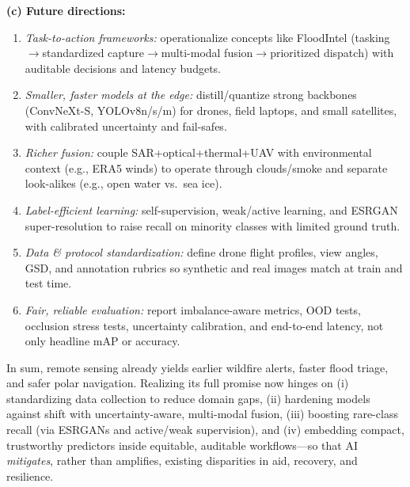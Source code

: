\documentclass[conference,a4paper]{IEEEtran}
\begin{document}
\noindent\hspace*{1em}\textbf{(c) Future directions:}
\begin{enumerate}
  \item \textit{Task-to-action frameworks:} operationalize concepts like FloodIntel (tasking$\rightarrow$standardized capture$\rightarrow$multi-modal fusion$\rightarrow$prioritized dispatch) with auditable decisions and latency budgets.
  \item \textit{Smaller, faster models at the edge:} distill/quantize strong backbones (ConvNeXt-S, YOLOv8n/s/m) for drones, field laptops, and small satellites, with calibrated uncertainty and fail-safes.
  \item \textit{Richer fusion:} couple SAR+optical+thermal+UAV with environmental context (e.g., ERA5 winds) to operate through clouds/smoke and separate look-alikes (e.g., open water vs.\ sea ice).
  \item \textit{Label-efficient learning:} self-supervision, weak/active learning, and ESRGAN super-resolution to raise recall on minority classes with limited ground truth.
  \item \textit{Data \& protocol standardization:} define drone flight profiles, view angles, GSD, and annotation rubrics so synthetic and real images match at train and test time.
  \item \textit{Fair, reliable evaluation:} report imbalance-aware metrics, OOD tests, occlusion stress tests, uncertainty calibration, and end-to-end latency, not only headline mAP or accuracy.
\end{enumerate}

In sum, remote sensing already yields earlier wildfire alerts, faster flood triage, and safer polar navigation. Realizing its full promise now hinges on (i) standardizing data collection to reduce domain gaps, (ii) hardening models against shift with uncertainty-aware, multi-modal fusion, (iii) boosting rare-class recall (via ESRGANs and active/weak supervision), and (iv) embedding compact, trustworthy predictors inside equitable, auditable workflows---so that AI \emph{mitigates}, rather than amplifies, existing disparities in aid, recovery, and resilience.




  
\end{document}
